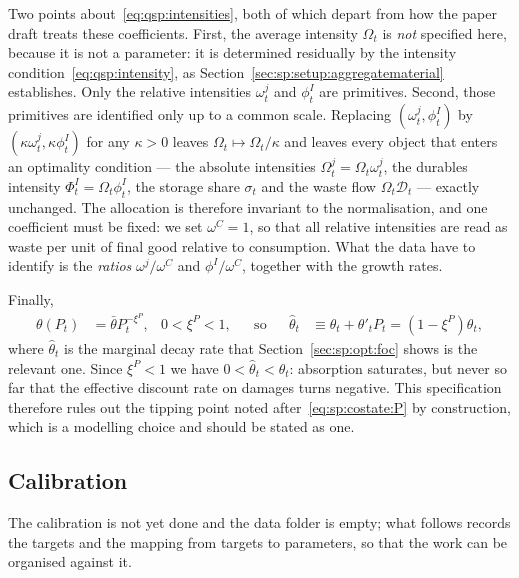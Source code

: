 \begin{remark}\label{rem:qsp:scale}
Two points about~\eqref{eq:qsp:intensities}, both of which depart from how the paper draft treats these
coefficients. First, the average intensity $\Omega_t$ is \emph{not} specified here, because it is not a
parameter: it is determined residually by the intensity condition~\eqref{eq:qsp:intensity}, as
Section~\ref{sec:sp:setup:aggregatematerial} establishes. Only the relative intensities $\omega^j_t$ and
$\phi^I_t$ are primitives. Second, those primitives are identified only up to a common scale. Replacing
$\left(\omega^j_t,\phi^I_t\right)$ by $\left(\kappa\omega^j_t,\kappa\phi^I_t\right)$ for any $\kappa>0$
leaves $\Omega_t\mapsto\Omega_t/\kappa$ and leaves every object that enters an optimality condition ---
the absolute intensities $\Omega^j_t=\Omega_t\omega^j_t$, the durables intensity
$\Phi^I_t=\Omega_t\phi^I_t$, the storage share $\sigma_t$ and the waste flow $\Omega_t\mathcal D_t$ ---
exactly unchanged. The allocation is therefore invariant to the normalisation, and one coefficient must
be fixed: we set $\omega^C=1$, so that all relative intensities are read as waste per unit of final good
relative to consumption. What the data have to identify is the \emph{ratios} $\omega^j/\omega^C$ and
$\phi^I/\omega^C$, together with the growth rates.
\end{remark}

 Finally,
\begin{align}
\theta\!\left(P_t\right) &= \bar\theta P_t^{-\xi^P},
&
0<\xi^P<1,
&&\text{so}&&
\hat\theta_t &\equiv \theta_t+\theta'_tP_t = \left(1-\xi^P\right)\theta_t ,
\label{eq:qsp:absorption}
\end{align}
where $\hat\theta_t$ is the marginal decay rate that Section~\ref{sec:sp:opt:foc} shows is the relevant
one. Since $\xi^P<1$ we have $0<\hat\theta_t<\theta_t$: absorption saturates, but never so far that the
effective discount rate on damages turns negative. This specification therefore rules out the tipping
point noted after~\eqref{eq:sp:costate:P} by construction, which is a modelling choice and should be
stated as one.

\subsection{Calibration}\label{sec:qsp:setup:calibration}

The calibration is not yet done and the data folder is empty; what follows records the targets and the
mapping from targets to parameters, so that the work can be organised against it.

